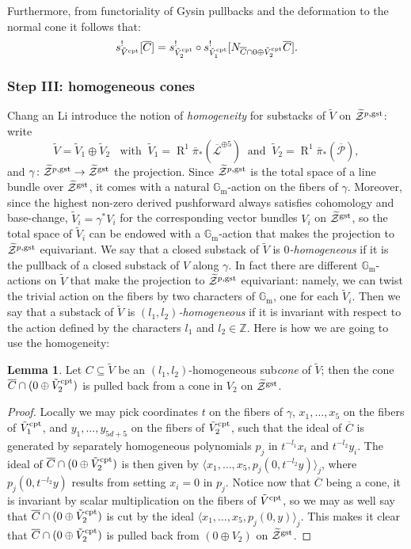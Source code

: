 \documentclass[11pt]{amsart}
\newcommand{\pazocal}{\mathcal}
\newcommand{\tZ}{\widetilde{\pazocal Z}}
\newcommand{\Z}{\mathbb{Z}}
\renewcommand{\to}{\rightarrow}
\newcommand{\Gm}{\mathbb{G}_{\text{m}}}
\newcommand{\hL}{\overline{\mathcal{L}}}
\theoremstyle{definition}
\newtheorem{lem}[thm]{Lemma}
\theoremstyle{definition}
\begin{document}
 Furthermore, from functoriality of Gysin pullbacks and the deformation to the normal cone it follows that:
 \[s^!_{\tilde V^{\rm{cpt}}}[\overline C]=s^!_{\tilde V_2^{\rm{cpt}}}\circ s^!_{\tilde V_1^{\rm{cpt}}}[N_{\overline C\cap 0\oplus\tilde V_2^{\rm{cpt}}}\overline C].\]
 
 \subsubsection{Step III: homogeneous cones}
Chang an Li introduce the notion of \emph{homogeneity} for substacks of $\tilde V$ on $\tZ^{p,\rm{gst}}$: write 
\[\tilde V=\tilde V_1\oplus\tilde V_2\;\;\text{ with} \;\;\tilde V_1=\operatorname{R}^1\bar{\pi}_*(\hL^{\oplus 5})\;\; \text{and}\;\; \tilde V_2=\operatorname{R}^1\bar{\pi}_*(\overline{\mathcal P}),\]
 and $\gamma\colon \tZ^{p,\rm{gst}}\to\tZ^{\rm{gst}}$ the projection. Since $\tZ^{p,\rm{gst}}$ is the total space of a line bundle over $\tZ^{\rm{gst}}$, it comes with a natural $\Gm$-action on the fibers of $\gamma$. Moreover, since the highest non-zero derived pushforward always satisfies cohomology and base-change, $\tilde V_i=\gamma^*V_i$ for the corresponding vector bundles $V_i$ on $\tZ^{\rm{gst}}$, so the total space of $\tilde V_i$ can be endowed with a $\Gm$-action that makes the projection to $\tZ^{p,\rm{gst}}$ equivariant. We say that a closed substack of $\tilde V$ is $0$\emph{-homogeneous} if it is the pullback of a closed substack of $V$ along $\gamma$. In fact there are different $\Gm$-actions on $\tilde V$ that make the projection to $\tZ^{p,\rm{gst}}$ equivariant: namely, we can twist the trivial action on the fibers by two characters of $\Gm$, one for each $\tilde V_i$. Then we say that a substack of $\tilde V$ is $(l_1,l_2)$\emph{-homogeneous} if it is invariant with respect to the action defined by the characters $l_1$ and $l_2\in\Z$. Here is how we are going to use the homogeneity:

\begin{lem}
 Let $C\subseteq \tilde V$ be an $(l_1,l_2)$-homogeneous sub\emph{cone} of $\tilde V$; then the cone $\overline{C}\cap(0\oplus\tilde V_2^{\rm{cpt}})$ is pulled back from a cone in $V_2$ on $\tZ^{\rm{gst}}$.
\end{lem}
\begin{proof}
 Locally we may pick coordinates $t$ on the fibers of $\gamma$, $x_1,\ldots,x_5$ on the fibers of $\tilde V_1^{\rm{cpt}}$, and $y_1,\ldots,y_{5d+5}$ on the fibers of $\tilde V_2^{\rm{cpt}}$, such that the ideal of $\overline{C}$ is generated by separately homogeneous polynomials $p_j$ in $t^{-l_1}x_i$ and $t^{-l_2}y_i$. The ideal of $\overline{C}\cap(0\oplus\tilde V_2^{\rm{cpt}})$ is then given by $\langle x_1,\ldots, x_5,p_j(0,t^{-l_2}y)\rangle_j$, where $p_j(0,t^{-l_2}y)$ results from setting $x_i=0$ in $p_j$. Notice now that $\overline{C}$ being a cone, it is invariant by scalar multiplication on the fibers of $\tilde V^{\rm{cpt}}$, so we may as well say that $\overline{C}\cap(0\oplus\tilde V_2^{\rm{cpt}})$ is cut by the ideal $\langle x_1,\ldots, x_5,p_j(0,y)\rangle_j$. This makes it clear that $\overline{C}\cap(0\oplus\tilde V_2^{\rm{cpt}})$ is pulled back from $(0\oplus V_2)$ on $\tZ^{\rm{gst}}$.
\end{proof}
\end{document}
